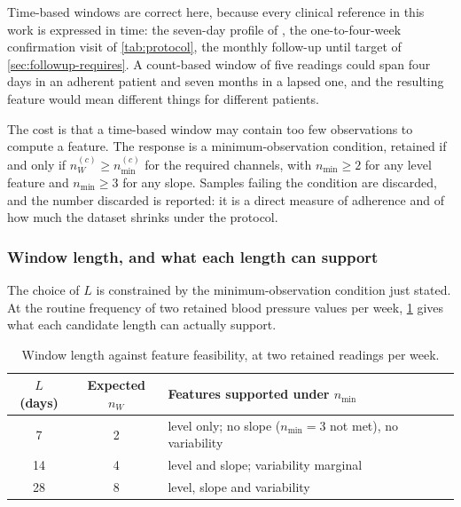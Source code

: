 \documentclass[12pt,a4paper,oneside]{report}
\begin{document}
Time-based windows are correct here, because every clinical reference in this work is expressed in time: the seven-day profile of \textcite{mihevc2025}, the one-to-four-week confirmation visit of \cref{tab:protocol}, the monthly follow-up until target of \cref{sec:followup-requires}. A count-based window of five readings could span four days in an adherent patient and seven months in a lapsed one, and the resulting feature would mean different things for different patients.

The cost is that a time-based window may contain too few observations to compute a feature. The response is a minimum-observation condition, retained if and only if $n^{(c)}_W \geq n^{(c)}_{\min}$ for the required channels, with $n_{\min} \geq 2$ for any level feature and $n_{\min} \geq 3$ for any slope. Samples failing the condition are discarded, and the number discarded is reported: it is a direct measure of adherence and of how much the dataset shrinks under the protocol.

\subsubsection{Window length, and what each length can support}\label{sec:window-length}

The choice of $L$ is constrained by the minimum-observation condition just stated. At the routine frequency of two retained blood pressure values per week, \cref{tab:window-length} gives what each candidate length can actually support.

\begin{table}[htbp]
\centering\small
\caption{Window length against feature feasibility, at two retained readings per week.}\label{tab:window-length}
\begin{tabularx}{\textwidth}{@{}c c X@{}}
\toprule
\textbf{$L$ (days)} & \textbf{Expected $n_W$} & \textbf{Features supported under $n_{\min}$} \\
\midrule
7 & 2 & level only; no slope ($n_{\min} = 3$ not met), no variability \\
14 & 4 & level and slope; variability marginal \\
28 & 8 & level, slope and variability \\
\bottomrule
\end{tabularx}
\end{table}
\end{document}
